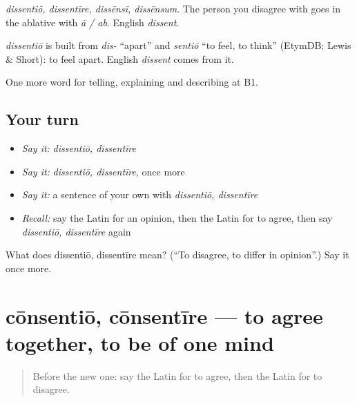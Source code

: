 \emph{dissentiō, dissentīre, dissēnsī, dissēnsum}. The person you disagree with goes in the ablative with \emph{ā / ab}. English \emph{dissent}.

\begin{cousinweb}
\emph{dissentiō} is built from \emph{dis-} \textquotedblleft{}apart\textquotedblright{} and \emph{sentiō} \textquotedblleft{}to feel, to think\textquotedblright{} (EtymDB; Lewis \& Short): to feel apart. English \emph{dissent} comes from it.
\end{cousinweb}

\begin{grammarlens}[title={What you've built}]
One more word for telling, explaining and describing at B1.
\end{grammarlens}

\subsection*{Your turn}
\begin{itemize}
\raggedright
  \item \emph{Say it:} \emph{dissentiō, dissentīre}
  \item \emph{Say it:} \emph{dissentiō, dissentīre}, once more
  \item \emph{Say it:} a sentence of your own with \emph{dissentiō, dissentīre}
  \item \emph{Recall:} say the Latin for an opinion, then the Latin for to agree, then say \emph{dissentiō, dissentīre} again
\end{itemize}

\begin{tcolorbox}[breakable,colback=teal!4,colframe=teal!35!black,title={Before you move on}]
What does dissentiō, dissentīre mean? (\textquotedblleft{}To disagree, to differ in opinion\textquotedblright{}.) Say it once more.
\end{tcolorbox}
\section[cōnsentiō, cōnsentīre]{cōnsentiō, cōnsentīre — to agree together, to be of one mind}

\label{lesson:LA-C358-consentio}



\begin{quote}
Before the new one: say the Latin for to agree, then the Latin for to disagree.
\end{quote}

